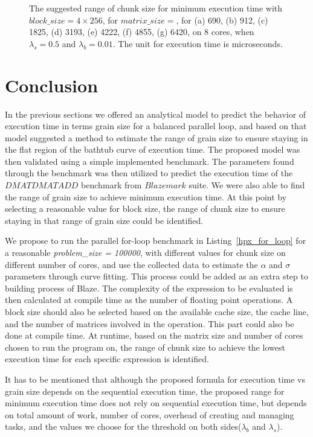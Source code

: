 \begin{figure}[H]
{		\label{fig57:g}}
	\caption{The suggested range of chunk size for minimum execution time with $block\_{size}=4\times{256}$, for $matrix\_size=$, for (a) 690, (b) 912, (c) 1825, (d) 3193, (e) 4222, (f) 4855, (g) 6420, on 8 cores, when $\lambda_{s}=0.5$ and $\lambda_{b}=0.01$. The unit for execution time is microseconds.}
	\label{fig57}	
\end{figure}


\section{Conclusion}
In the previous sections we offered an analytical model to predict the behavior of execution time in terms grain size for a balanced parallel loop, and based on that model suggested a method to estimate the range of grain size to ensure staying in the flat region of the bathtub curve of execution time. The proposed model was then validated using a simple implemented benchmark. The parameters found through the benchmark was then utilized to predict the execution time of the $DMATDMATADD$ benchmark from $Blazemark$ suite. We were also able to find the range of grain size to achieve minimum execution time. 
At this point by selecting a reasonable value for block size, the range of chunk size to ensure staying in that range of grain size could be identified.

We propose to run the parallel for-loop benchmark in Listing~\ref{hpx_for_loop} for a reasonable \emph{problem\_{size} = 100000}, with different values for chunk size on different number of cores, and use the collected data to estimate the $\alpha$ and $\sigma$ parameters through curve fitting. This process could be added as an extra step to building process of Blaze. 
The complexity of the expression to be evaluated is then calculated at compile time as the number of floating point operations. 
A block size should also be selected based on the available cache size, the cache line, and the number of matrices involved in the operation. This part could also be done at compile time.   
At runtime, based on the matrix size and number of cores chosen to run the program on, the range of chunk size to achieve the lowest execution time for each specific expression is identified.

It has to be mentioned that although the proposed formula for execution time vs grain size depends on the sequential execution time, the proposed range for minimum execution time does not rely on sequential execution time, but depends on total amount of work, number of cores, overhead of creating and managing tasks, and the values we choose for the threshold on both sides($\lambda_{b}$ and $\lambda_{s}$).
 


